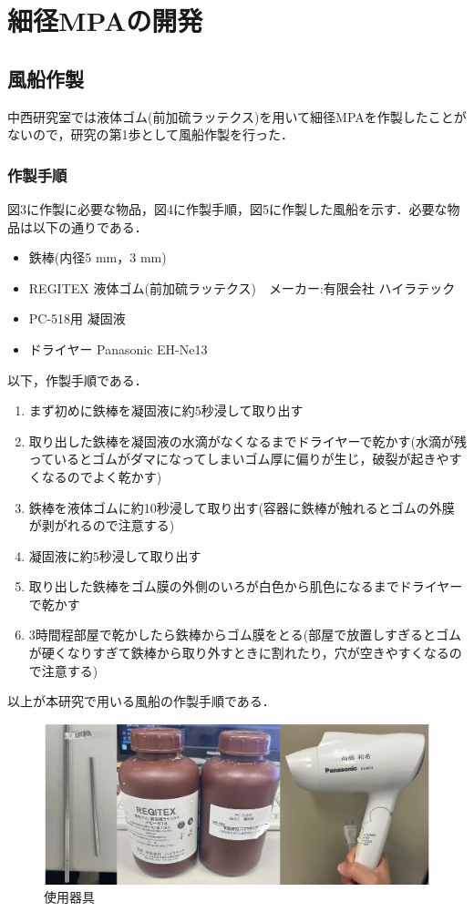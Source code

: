 \newpage
\section{細径MPAの開発}
\subsection{風船作製}
中西研究室では液体ゴム(前加硫ラッテクス)を用いて細径MPAを作製したことがないので，研究の第1歩として風船作製を行った．
\subsubsection{作製手順}
図3に作製に必要な物品，図4に作製手順，図5に作製した風船を示す．必要な物品は以下の通りである．
\begin{itemize}
    \item 鉄棒(内径5 mm，3 mm)
    \item REGITEX 液体ゴム(前加硫ラッテクス)　メーカー:有限会社 ハイラテック
    \item PC-518用 凝固液
    \item ドライヤー Panasonic EH-Ne13
  \end{itemize}
  以下，作製手順である．
\begin{enumerate}
    \item まず初めに鉄棒を凝固液に約5秒浸して取り出す
    \item 取り出した鉄棒を凝固液の水滴がなくなるまでドライヤーで乾かす(水滴が残っているとゴムがダマになってしまいゴム厚に偏りが生じ，破裂が起きやすくなるのでよく乾かす)
    \item 鉄棒を液体ゴムに約10秒浸して取り出す(容器に鉄棒が触れるとゴムの外膜が剥がれるので注意する)
    \item 凝固液に約5秒浸して取り出す
    \item 取り出した鉄棒をゴム膜の外側のいろが白色から肌色になるまでドライヤーで乾かす
    \item 3時間程部屋で乾かしたら鉄棒からゴム膜をとる(部屋で放置しすぎるとゴムが硬くなりすぎて鉄棒から取り外すときに割れたり，穴が空きやすくなるので注意する)
\end{enumerate}
以上が本研究で用いる風船の作製手順である．
\begin{figure}[!b]
  \centering  %
  \includegraphics[scale=0.3]{pic/kigu.PNG}
  \caption{使用器具}
\end{figure}

